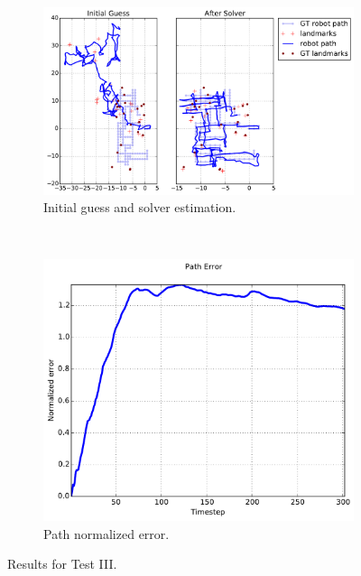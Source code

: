 {\begin{figure}[htbp!]
    \centering
    \begin{subfigure}[b]{\estWidth\textwidth}
        \includegraphics[width=\textwidth]{imagenes/tests/known/res_it_20_nl_40_op_10_oa_10_lp_10_ds_300_kw_1.pdf}
        \caption{Initial guess and solver estimation.}
        \label{fig:test-iiia}
    \end{subfigure}\\
    \begin{subfigure}[b]{\errorWidth\textwidth}
        \includegraphics[width=\textwidth]{imagenes/tests/known/res_it_20_nl_40_op_10_oa_10_lp_10_ds_300_kw_1_path.pdf}
        \caption{Path normalized error.}
        \label{fig:test-iiib}
    \end{subfigure}
    \caption{Results for Test III.}
    \label{fig:test-iii}
\end{figure}
}


